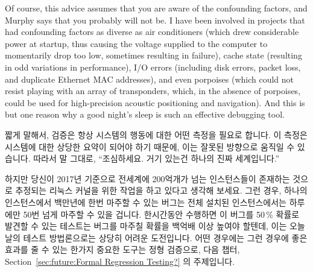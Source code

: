 Of course, this advice assumes that you are aware of the confounding
factors, and Murphy says that you probably will not be.
I have been involved in projects that had confounding factors as
diverse as air conditioners (which drew considerable power at startup,
thus causing the voltage supplied to the computer to momentarily drop
too low, sometimes resulting in failure), cache state (resulting in
odd variations in performance), I/O errors (including disk errors,
packet loss, and duplicate Ethernet MAC addresses), and even
porpoises (which could not resist playing with an array of transponders,
which, in the absence of porpoises, could be
used for high-precision acoustic positioning and navigation).
And this is but one reason why a good night's sleep is such an
effective debugging tool.
\fi

짧게 말해서, 검증은 항상 시스템의 행동에 대한 어떤 측정을 필요로 합니다.
이 측정은 시스템에 대한 상당한 요약이 되어야 하기 때문에, 이는 잘못된 방향으로
움직일 수 있습니다.
따라서 말 그대로, ``조심하세요.  거기 있는건 하나의 진짜 세계입니다.''

하지만 당신이 2017년 기준으로 전세계에 200억개가 넘는 인스턴스들이 존재하는
것으로 추정되는 리눅스 커널을 위한 작업을 하고 있다고 생각해 보세요.  그런
경우, 하나의 인스턴스에서 백만년에 한번 마주할 수 있는 버그는 전체 설치된
인스턴스에서는 하루에만 50번 넘게 마주할 수 있을 겁니다.  한시간동안 수행하면
이 버그를 50\,\% 확률로 발견할 수 있는 테스트는 버그를 마주칠 확률을 백억배
이상 높여야 할텐데, 이는 오늘날의 테스트 방법론으로는 상당히 어려운 도전입니다.
어떤 경우에는 그런 경우에 좋은 효과를 줄 수 있는 한가지 중요한 도구는 정형
검증으로, 다음 챕터, Section~\ref{sec:future:Formal Regression Testing?} 의
주제입니다.

